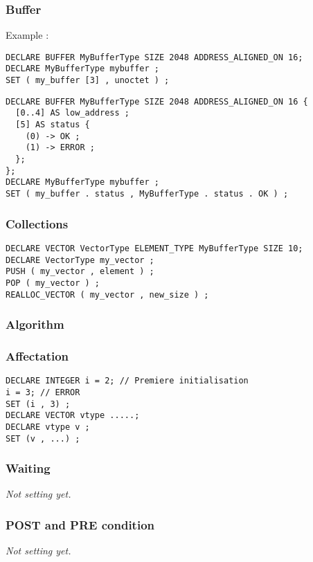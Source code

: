 \documentclass[american]{rtxreport}
\begin{document}
\subsubsection{Buffer}

Example :
\begin{lstlisting}
DECLARE BUFFER MyBufferType SIZE 2048 ADDRESS_ALIGNED_ON 16;
DECLARE MyBufferType mybuffer ;
SET ( my_buffer [3] , unoctet ) ;
\end{lstlisting}


\begin{lstlisting}
DECLARE BUFFER MyBufferType SIZE 2048 ADDRESS_ALIGNED_ON 16 {
  [0..4] AS low_address ;
  [5] AS status {
    (0) -> OK ;
    (1) -> ERROR ;
  };
};
DECLARE MyBufferType mybuffer ;
SET ( my_buffer . status , MyBufferType . status . OK ) ;
\end{lstlisting}

\subsubsection{Collections}

\begin{lstlisting}
DECLARE VECTOR VectorType ELEMENT_TYPE MyBufferType SIZE 10;
DECLARE VectorType my_vector ;
PUSH ( my_vector , element ) ;
POP ( my_vector ) ;
REALLOC_VECTOR ( my_vector , new_size ) ;
\end{lstlisting}

\subsubsection{Algorithm}

\subsubsection{Affectation}

\begin{lstlisting}
DECLARE INTEGER i = 2; // Premiere initialisation
i = 3; // ERROR
SET (i , 3) ; 
DECLARE VECTOR vtype .....;
DECLARE vtype v ;
SET (v , ...) ;
\end{lstlisting}

\subsubsection{Waiting}

\emph{Not setting yet.}

\subsubsection{POST and PRE condition}
\emph{Not setting yet.}
\end{document}
